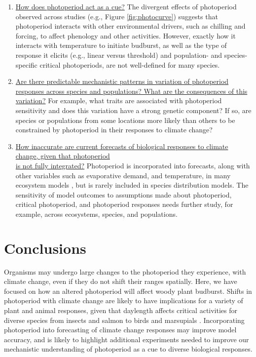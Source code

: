 \documentclass{article}
\begin{document}
\begin{enumerate}
\item \underline{How does photoperiod act as a cue?} The divergent effects of photoperiod observed across studies (e.g., Figure \ref{fig:photocurve}) suggests that photoperiod interacts with other environmental drivers, such as chilling and forcing, to affect phenology and other activities. However, exactly how it interacts with temperature to initiate budburst, as well as the type of response it elicits (e.g., linear versus threshold) and population- and species-specific critical photoperiods, are not well-defined for many species.  
\item \underline{Are there predictable mechanistic patterns in variation of photoperiod responses across species and populations? What are the consequences of this variation?} For example, what traits are associated with photoperiod sensitivity and does this variation have a strong genetic component? If so, are species or populations from some locations more likely than others to be constrained by photoperiod in their responses to climate change?

\item \underline{How inaccurate are current forecasts of biological responses to climate change, given that photoperiod \\
is not fully integrated?} Photoperiod is incorporated into forecasts, along with other variables such as evaporative demand, and temperature, in many ecosystem models \citep [e.g. ED] []{jolly2005, medvigy2013}, but is rarely included in species distribution models. The sensitivity of model outcomes to assumptions made about photoperiod, critical photoperiod, and photoperiod responses needs further study, for example, across ecosystems, species, and populations.

\end{enumerate}

\section*{Conclusions}
Organisms may undergo large changes to the photoperiod they experience, with climate change, even if they do not shift their ranges spatially.  Here, we have focused on how an altered photoperiod will affect woody plant budburst. Shifts in photoperiod with climate change are likely to have implications for a variety of plant and animal responses, given that daylength affects critical activities for diverse species from insects \citep{bradshaw2006,linn1996} and salmon \citep{solbakken1994,taranger2003} to birds \citep{dawson2001} and marsupials \citep{mcallan2006,solbakken1994}. Incorporating photoperiod into forecasting of climate change responses may improve model accuracy, and is likely to highlight additional experiments needed to improve our mechanistic understanding of photoperiod as a cue to diverse biological responses. 
\end{document}
